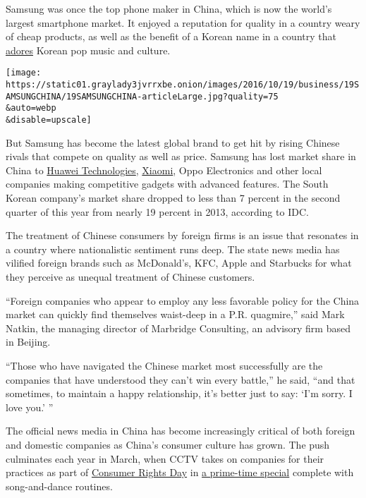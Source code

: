 Samsung was once the top phone maker in China, which is now the world's
largest smartphone market. It enjoyed a reputation for quality in a
country weary of cheap products, as well as the benefit of a Korean name
in a country that
\href{http://www.nytimes3xbfgragh.onion/2015/07/21/arts/television/chinas-love-affair-with-irresistible-korean-tv.html}{adores}
Korean pop music and culture.

\texttt{[image: https://static01.graylady3jvrrxbe.onion/images/2016/10/19/business/19SAMSUNGCHINA/19SAMSUNGCHINA-articleLarge.jpg?quality=75\\\&auto=webp\\\&disable=upscale]}

But Samsung has become the latest global brand to get hit by rising
Chinese rivals that compete on quality as well as price. Samsung has
lost market share in China to
\href{http://bits.blogs.nytimes3xbfgragh.onion/2014/05/07/huawei-unveils-new-phone-to-compete-with-apple-and-samsung/}{Huawei
Technologies},
\href{http://www.nytimes3xbfgragh.onion/2014/12/15/technology/the-rise-of-a-new-smartphone-giant-chinas-xiaomi.html}{Xiaomi},
Oppo Electronics and other local companies making competitive gadgets
with advanced features. The South Korean company's market share dropped
to less than 7 percent in the second quarter of this year from nearly 19
percent in 2013, according to IDC.

The treatment of Chinese consumers by foreign firms is an issue that
resonates in a country where nationalistic sentiment runs deep. The
state news media has vilified foreign brands such as McDonald's, KFC,
Apple and Starbucks for what they perceive as unequal treatment of
Chinese customers.

``Foreign companies who appear to employ any less favorable policy for
the China market can quickly find themselves waist-deep in a P.R.
quagmire,'' said Mark Natkin, the managing director of Marbridge
Consulting, an advisory firm based in Beijing.

``Those who have navigated the Chinese market most successfully are the
companies that have understood they can't win every battle,'' he said,
``and that sometimes, to maintain a happy relationship, it's better just
to say: `I'm sorry. I love you.' ''

The official news media in China has become increasingly critical of
both foreign and domestic companies as China's consumer culture has
grown. The push culminates each year in March, when CCTV takes on
companies for their practices as part of
\href{http://www.consumersinternational.org/our-work/wcrd/about-wcrd/}{Consumer
Rights Day} in
\href{http://english.cntv.cn/2015/03/16/VIDE1426482244132567.shtml}{a
prime-time special} complete with song-and-dance routines.

